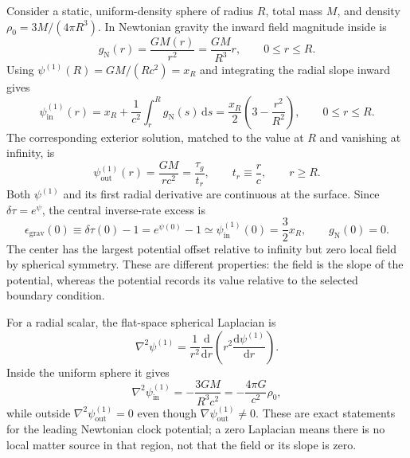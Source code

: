 \documentclass[12pt]{article}
\begin{document}
Consider a static, uniform-density sphere of radius $R$, total mass $M$, and density $\rho_0=3M/(4\pi R^3)$. In Newtonian gravity the inward field magnitude inside is
\begin{equation}
  g_{\mathrm{N}}(r)=\frac{GM(r)}{r^2}
  =\frac{GM}{R^3}r,
  \qquad 0\leq r\leq R.
  \label{eq:uniform-field}
\end{equation}
Using $\psi^{(1)}(R)=GM/(Rc^2)=x_R$ and integrating the radial slope inward gives
\begin{equation}
  \psi^{(1)}_{\mathrm{in}}(r)
  =x_R+\frac{1}{c^2}\int_r^R g_{\mathrm{N}}(s)\,\mathrm{d}s
  =\frac{x_R}{2}\left(3-\frac{r^2}{R^2}\right),
  \qquad 0\leq r\leq R.
  \label{eq:interior-profile}
\end{equation}
The corresponding exterior solution, matched to the value at $R$ and vanishing at infinity, is
\begin{equation}
  \psi^{(1)}_{\mathrm{out}}(r)
  =\frac{GM}{rc^2}
  =\frac{\tau_g}{t_r},
  \qquad
  t_r\equiv\frac{r}{c},
  \qquad r\geq R.
  \label{eq:exterior-profile}
\end{equation}
Both $\psi^{(1)}$ and its first radial derivative are continuous at the surface. Since $\delta\tau=e^{\psi}$, the central inverse-rate excess is
\begin{equation}
  \epsilon_{\mathrm{grav}}(0)\equiv\delta\tau(0)-1
  =e^{\psi(0)}-1\simeq\psi^{(1)}_{\mathrm{in}}(0)=\frac{3}{2}x_R,
  \qquad
  g_{\mathrm{N}}(0)=0.
  \label{eq:central-uniform}
\end{equation}
The center has the largest potential offset relative to infinity but zero local field by spherical symmetry. These are different properties: the field is the slope of the potential, whereas the potential records its value relative to the selected boundary condition.

For a radial scalar, the flat-space spherical Laplacian is
\begin{equation}
  \nabla^2\psi^{(1)}
  =\frac{1}{r^2}\frac{\mathrm{d}}{\mathrm{d}r}
    \left(r^2\frac{\mathrm{d}\psi^{(1)}}{\mathrm{d}r}\right).
  \label{eq:spherical-laplacian}
\end{equation}
Inside the uniform sphere it gives
\begin{equation}
  \nabla^2\psi^{(1)}_{\mathrm{in}}
  =-\frac{3GM}{R^3c^2}
  =-\frac{4\pi G}{c^2}\rho_0,
  \label{eq:interior-laplacian}
\end{equation}
while outside $\nabla^2\psi^{(1)}_{\mathrm{out}}=0$ even though $\nabla\psi^{(1)}_{\mathrm{out}}\neq0$. These are exact statements for the leading Newtonian clock potential; a zero Laplacian means there is no local matter source in that region, not that the field or its slope is zero.
\end{document}
